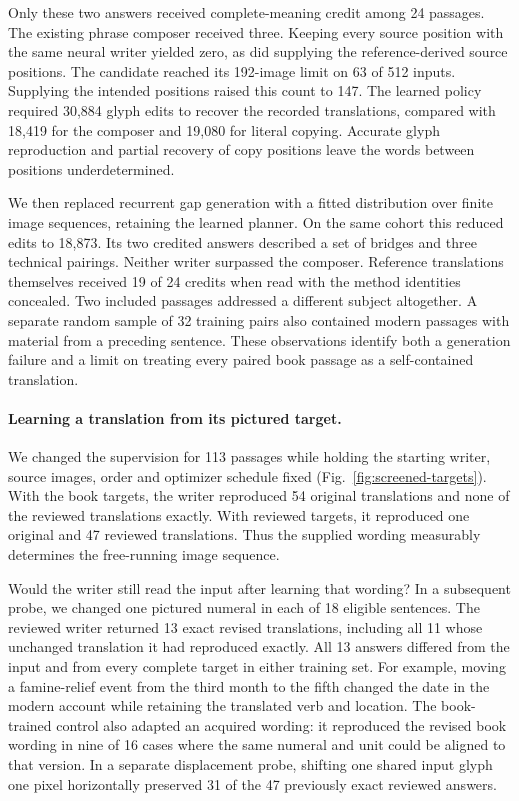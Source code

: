 \documentclass[12pt,a4paper]{article}
\providecommand{\DIFadd}[1]{{\protect\color{blue} \sf #1}} %
\begin{document}
\DIFadd{Only these two answers received complete-meaning credit among 24 passages. The existing phrase composer received three. Keeping every source position with the same neural writer yielded zero, as did supplying the reference-derived source positions. The candidate reached its 192-image limit on 63 of 512 inputs. Supplying the intended positions raised this count to 147. The learned policy required 30,884 glyph edits to recover the recorded translations, compared with 18,419 for the composer and 19,080 for literal copying. Accurate glyph reproduction and partial recovery of copy positions leave the words between positions underdetermined.
}

\DIFadd{We then replaced recurrent gap generation with a fitted distribution over finite image sequences, retaining the learned planner. On the same cohort this reduced edits to 18,873. Its two credited answers described a set of bridges and three technical pairings. Neither writer surpassed the composer. Reference translations themselves received 19 of 24 credits when read with the method identities concealed. Two included passages addressed a different subject altogether. A separate random sample of 32 training pairs also contained modern passages with material from a preceding sentence. These observations identify both a generation failure and a limit on treating every paired book passage as a self-contained translation.
}

\paragraph{\DIFadd{Learning a translation from its pictured target.}}
\DIFadd{We changed the supervision for 113 passages while holding the starting writer, source images, order and optimizer schedule fixed (Fig.~\ref{fig:screened-targets}). With the book targets, the writer reproduced 54 original translations and none of the reviewed translations exactly. With reviewed targets, it reproduced one original and 47 reviewed translations. Thus the supplied wording measurably determines the free-running image sequence.
}

\DIFadd{Would the writer still read the input after learning that wording? In a subsequent probe, we changed one pictured numeral in each of 18 eligible sentences. The reviewed writer returned 13 exact revised translations, including all 11 whose unchanged translation it had reproduced exactly. All 13 answers differed from the input and from every complete target in either training set. For example, moving a famine-relief event from the third month to the fifth changed the date in the modern account while retaining the translated verb and location. The book-trained control also adapted an acquired wording: it reproduced the revised book wording in nine of 16 cases where the same numeral and unit could be aligned to that version. In a separate displacement probe, shifting one shared input glyph one pixel horizontally preserved 31 of the 47 previously exact reviewed answers.
}
\end{document}
